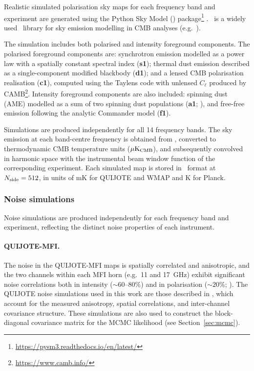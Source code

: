 Realistic simulated polarisation sky maps for each frequency band and experiment are generated using the Python Sky Model (\pysm) package\footnote{\url{https://pysm3.readthedocs.io/en/latest/}} \citep{Pysm}. \pysm\ is a widely used \python\ library for sky emission modelling in CMB analyses (e.g.\ \citealt{Planck_2020LVII, Martire_2022}).

The simulation includes both polarised and intensity foreground components. The polarised foreground components are: synchrotron emission modelled as a power law with a spatially constant spectral index (\textbf{s1}); thermal dust emission described as a single-component modified blackbody (\textbf{d1}); and a lensed CMB polarisation realisation (\textbf{c1}), computed using the Taylens code \citep{Taylens} with unlensed $C_\ell$ produced by CAMB\footnote{\url{https://www.camb.info/}}. Intensity foreground components are also included: spinning dust (AME) modelled as a sum of two spinning dust populations (\textbf{a1}; \citealt{Planck_2015X}), and free-free emission following the analytic Commander model (\textbf{f1}).

Simulations are produced independently for all 14 frequency bands. The sky emission at each band-centre frequency is obtained from \pysm, converted to thermodynamic CMB temperature units ($\mu\mathrm{K}_{\rm CMB}$), and subsequently convolved in harmonic space with the instrumental beam window function of the corresponding experiment. Each simulated map is stored in \healpix\ format at $N_{\rm side} = 512$, in units of mK for QUIJOTE and WMAP and K for Planck.

\subsubsection{Noise simulations}
\label{sec:noise_simulations}

Noise simulations are produced independently for each frequency band and experiment, reflecting the distinct noise properties of each instrument.

\paragraph{QUIJOTE-MFI.} The noise in the QUIJOTE-MFI maps is spatially correlated and anisotropic, and the two channels within each MFI horn (e.g.\ 11 and 17~GHz) exhibit significant noise correlations both in intensity ($\sim 60$--$80\%$) and in polarisation ($\sim 20\%$; \citealt{QUIJOTE_IV}). The QUIJOTE noise simulations used in this work are those described in \citet{QUIJOTE_IV}, which account for the measured anisotropy, spatial correlations, and inter-channel covariance structure. These simulations are also used to construct the block-diagonal covariance matrix for the MCMC likelihood (see Section~\ref{sec:mcmc}).

